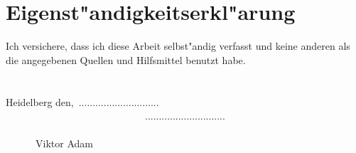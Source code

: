 

\thispagestyle{empty}

\section*{Eigenst"andigkeitserkl"arung}

Ich versichere, dass ich diese Arbeit selbst"andig verfasst und keine anderen als die angegebenen
Quellen und Hilfsmittel benutzt habe. \\ \\ \\

Heidelberg den,\ .............................     \ \ \ \ \ \ \ \ \ \ \ \ \ \ \ \ \ \ \ \ \ \ \ \ \ \ \ \ \qquad \qquad  ............................. \\

\ \ \ \ \ \ \ \ \ \ \ \ \ \ \ \ \ \ \ \ \ \ \ \ \ \ \ \ \ \ \ \ \ \ \ \ \ \ \ \ \ \ \ \ \ \ \ \ \ \  \ \ \ \ \ \ \ \ \ \ \ \ \ \ \ \ \ \ \ \ \ \ \ \ \ \ \ \ \qquad \qquad   Viktor Adam



\cleardoublepage
\thispagestyle{empty}
